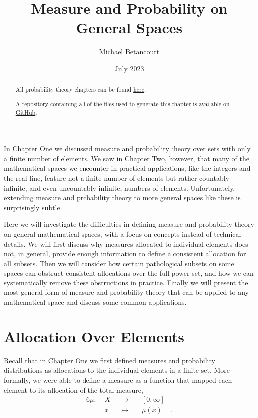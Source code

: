 \documentclass[
  letterpaper,
  DIV=11,
  numbers=noendperiod]{scrartcl}
\title{Measure and Probability on General Spaces}
\author{Michael Betancourt}
\date{July 2023}
\renewcommand*\contentsname{Table of contents}
\newcommand\contentsname{Table of contents}
\begin{document}
\maketitle
\begin{abstract}
All probability theory chapters can be found
\href{http://www.symplectomorphic.com/writing/\#part1}{here}.

A repository containing all of the files used to generate this chapter
is available on
\href{https://github.com/betanalpha/quarto_chapters/tree/main/4_probability_on_general_spaces}{GitHub}.
\end{abstract}

\renewcommand*\contentsname{Table of contents}
{
\hypersetup{linkcolor=}
\setcounter{tocdepth}{3}
\tableofcontents
}
In
\href{http://www.symplectomorphic.com/assets/chapters_html/probability_on_finite_sets.html}{Chapter
One} we discussed measure and probability theory over sets with only a
finite number of elements. We saw in
\href{http://www.symplectomorphic.com/assets/chapters_html/spaces.html}{Chapter
Two}, however, that many of the mathematical spaces we encounter in
practical applications, like the integers and the real line, feature not
a finite number of elements but rather countably infinite, and even
uncountably infinite, numbers of elements. Unfortunately, extending
measure and probability theory to more general spaces like these is
surprisingly subtle.

Here we will investigate the difficulties in defining measure and
probability theory on general mathematical spaces, with a focus on
concepts instead of technical details. We will first discuss why
measures allocated to individual elements does not, in general, provide
enough information to define a consistent allocation for all subsets.
Then we will consider how certain pathological subsets on some spaces
can obstruct consistent allocations over the full power set, and how we
can systematically remove these obstructions in practice. Finally we
will present the most general form of measure and probability theory
that can be applied to any mathematical space and discuss some common
applications.

\section{Allocation Over Elements}\label{allocation-over-elements}

Recall that in
\href{http://www.symplectomorphic.com/assets/chapters_html/probability_on_finite_sets.html}{Chapter
One} we first defined measures and probability distributions as
allocations to the individual elements in a finite set. More formally,
we were able to define a measure as a function that mapped each element
to its allocation of the total measure, \begin{alignat*}{6}
\mu :\; & X & &\rightarrow& \; & [0, \infty] &
\\
& x & &\mapsto& & \mu(x) &.
\end{alignat*}
\end{document}
